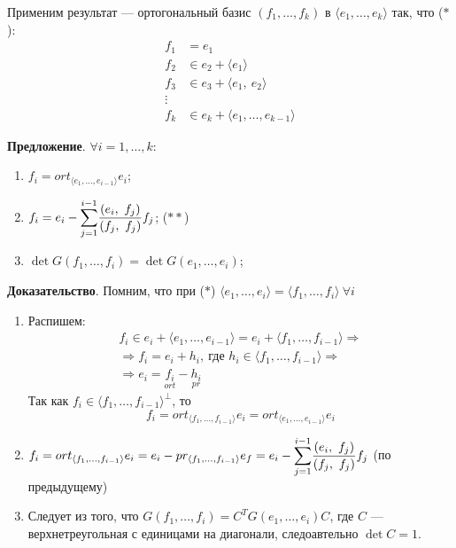 \documentclass[a4paper, 12pt]{article}
\begin{document}
Применим результат --- ортогональный базис $(f_1, \ldots, f_k)$ в $\langle e_1, \ldots, e_k \rangle$ так, что ($*$):
\vspace{-3mm}
\begin{align*}
f_1 &= e_1 \\
f_2 &\in e_2 + \langle e_1 \rangle \\
f_3 &\in e_3 + \langle e_1,\ e_2 \rangle \\[-0.3mm]
\vdots \\[-0.3em]
f_k &\in e_k + \langle e_1, \ldots, e_{k - 1} \rangle
\end{align*}

\textbf{Предложение}. $\forall i = 1, \ldots, k$:
\vspace{-3mm}
\begin{enumerate}
\itemsep=-0.3em
\item $f_i = ort_{\langle e_1, \ldots, e_{i - 1}\rangle}e_i$;
\item $f_i = e_i - \mathlarger{\sum}\limits_{j = 1}^{i - 1}\dfrac{(e_i,\ f_j)}{(f_j,\ f_j)}f_j$; ($**$)
\item $\det G(f_1, \ldots, f_i) = \det G(e_1, \ldots, e_i)$;
\end{enumerate}

\textbf{Доказательство}. Помним, что при ($*$) $\langle e_1, \ldots, e_i \rangle = \langle f_1, \ldots, f_i \rangle\ \forall i$
\begin{enumerate}
\itemsep=0em
\item Распишем:
\begin{gather*}
f_i \in e_i + \langle e_1, \ldots, e_{i - 1} \rangle = e_i + \langle f_1, \ldots, f_{i - 1} \rangle \Rightarrow \\
\Rightarrow f_i = e_i + h_i,\ \text{где } h_i \in \langle f_1, \ldots, f_{i - 1} \rangle \Rightarrow \\
\Rightarrow e_i = \underset{ort}{f_i} - \underset{pr}{h_i}
\end{gather*}
Так как $f_i \in \langle f_1, \ldots, f_{i - 1} \rangle^\bot$, то
\[
f_i = ort_{\langle f_1, \ldots, f_{i - 1} \rangle}e_i = ort_{\langle e_1, \ldots, e_{i - 1} \rangle} e_i
\]
\item $f_i = ort_{\langle f_1, \ldots, f_{i - 1}\rangle}e_i = e_i - pr_{\langle f_1, \ldots, f_{i - 1}\rangle}e_f = e_i - \mathlarger{\sum}\limits_{j = 1}^{i - 1}\dfrac{(e_i,\ f_j)}{(f_j,\ f_j)}f_j$ (по предыдущему)
\item Следует из того, что $G(f_1, \ldots, f_i) = C^T G(e_1, \ldots, e_i)C$, где $C$ --- верхнетреугольная с единицами на диагонали, следоавтельно $\det C = 1$.
\end{enumerate}
\end{document}
